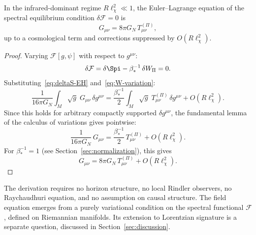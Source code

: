     \begin{theorem}
      \label{thm:einstein}
      In the infrared-dominant regime $R\ell_\chi^2 \ll 1$, the Euler--Lagrange
      equation of the spectral equilibrium condition $\delta\mathcal{F} = 0$ is
      \begin{equation}
        G_{\mu\nu} = 8\pi G_N\,T^{(\Pi)}_{\mu\nu},
        \label{eq:einstein}
      \end{equation}
      up to a cosmological term and corrections suppressed by $O(R\ell_\chi^2)$.
    \end{theorem}

    \begin{proof}
      Varying $\mathcal{F}[g,\psi]$ with respect to $g^{\mu\nu}$:
      \begin{equation}
        \delta\mathcal{F}
        = \delta\Spi - \beta_*^{-1}\,\delta W_\Pi = 0.
        \label{eq:delta-F}
      \end{equation}
      Substituting~\eqref{eq:deltaS-EH} and~\eqref{eq:W-variation}:
      \begin{equation}
        \frac{1}{16\pi G_N}\int_M\sqrt{g}\;G_{\mu\nu}\,\delta g^{\mu\nu}
        = \frac{\beta_*^{-1}}{2}\int_M\sqrt{g}\;T^{(\Pi)}_{\mu\nu}\,\delta g^{\mu\nu}
        + O(R\ell_\chi^2).
        \label{eq:EL-integrated}
      \end{equation}
      Since this holds for arbitrary compactly supported $\delta g^{\mu\nu}$, the
      fundamental lemma of the calculus of variations gives pointwise:
      \begin{equation}
        \frac{1}{16\pi G_N}\,G_{\mu\nu}
        = \frac{\beta_*^{-1}}{2}\,T^{(\Pi)}_{\mu\nu}
        + O(R\ell_\chi^2).
        \label{eq:EL-pointwise}
      \end{equation}
      For $\beta_*^{-1} = 1$ (see Section~\ref{sec:normalization}), this gives
      \begin{equation}
        G_{\mu\nu} = 8\pi G_N\,T^{(\Pi)}_{\mu\nu} + O(R\ell_\chi^2).
        \label{eq:einstein-proof}
      \end{equation}
    \end{proof}

    \begin{remark}
      \label{rem:no-horizon}
      The derivation requires no horizon structure, no local Rindler observers,
      no Raychaudhuri equation, and no assumption on causal structure.
      The field equation emerges from a purely variational condition on the spectral
      functional $\mathcal{F}$, defined on Riemannian manifolds.
      Its extension to Lorentzian signature is a separate question, discussed in
      Section~\ref{sec:discussion}.
    \end{remark}
